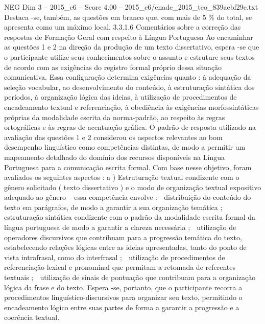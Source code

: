 \begin{textsample}{NEG Dim 3 – 2015\_c6 – Score 4.00 – 2015\_c6/enade\_2015\_teo\_839aebf29e.txt}
Destaca -se, também, as questões em branco que, com mais de 5 \% do total, se apresenta como um máximo local. 3.3.1.6 Comentários sobre a correção das respostas de Formação Geral com respeito à Língua Portuguesa Ao encaminhar as questões 1 e 2 na direção da produção de um texto dissertativo, espera -se que o participante utilize seus conhecimentos sobre o assunto e estruture seus textos de acordo com as exigências do registro formal próprio dessa situação comunicativa.
Essa configuração determina exigências quanto : à adequação da seleção vocabular, ao desenvolvimento do conteúdo, à estruturação sintática dos períodos, à organização lógica das ideias, à utilização de procedimentos de encadeamento textual e referenciação, à obediência às exigências morfossintáticas próprias da modalidade escrita da norma-padrão, ao respeito às regras ortográficas e às regras de acentuação gráfica.
O padrão de resposta utilizado na avaliação das questões 1 e 2 considerou os aspectos relevantes ao bom desempenho linguístico como competências distintas, de modo a permitir um mapeamento detalhado do domínio dos recursos disponíveis na Língua Portuguesa para a comunicação escrita formal.
Com base nesse objetivo, foram avaliados os seguintes aspectos : a ) Estruturação textual condizente com o gênero solicitado ( texto dissertativo ) e o modo de organização textual expositivo adequado ao gênero – essa competência envolve :  distribuição do conteúdo do texto em parágrafos, de modo a garantir a sua organização temática ;  estruturação sintática condizente com o padrão da modalidade escrita formal da língua portuguesa de modo a garantir a clareza necessária ;  utilização de operadores discursivos que contribuam para a progressão temática do texto, estabelecendo relações lógicas entre as ideias apresentadas, tanto do ponto de vista intrafrasal, como do interfrasal ;  utilização de procedimentos de referenciação lexical e pronominal que permitam a retomada de referentes textuais ;  utilização de sinais de pontuação que contribuam para a organização lógica da frase e do texto.
Espera -se, portanto, que o participante recorra a procedimentos linguístico-discursivos para organizar seu texto, permitindo o encadeamento lógico entre suas partes de forma a garantir a progressão e a coerência textual.

\end{textsample}
